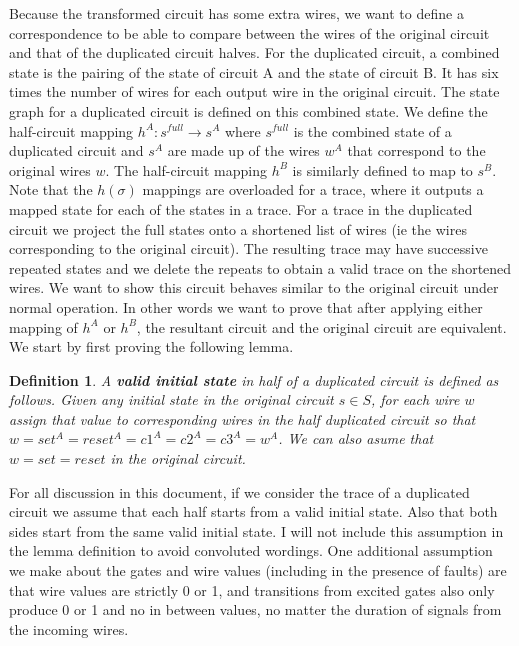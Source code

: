 \documentclass{article}
\newtheorem*{definition}{Definition}
\begin{document}
Because the transformed circuit has some extra wires, we want to define a correspondence to be able to compare between the wires of the original circuit and that of the duplicated circuit halves.  For the duplicated circuit, a combined state is the pairing of the state of circuit A and the state of circuit B. It has six times the number of wires for each output wire in the original circuit.  The state graph for a duplicated circuit is defined on this combined state.  We define the half-circuit mapping $h^A: s^{full} \to s^A$ where $s^{full}$ is the combined state of a duplicated circuit and $s^A$ are made up of the wires $w^A$ that correspond to the original wires $w$.  The half-circuit mapping $h^B$ is similarly defined to map to $s^B$.  Note that the $h(\sigma)$ mappings are overloaded for a trace, where it outputs a mapped state for each of the states in a trace.%
For a trace in the duplicated circuit we project the full states onto a shortened list of wires (ie the wires corresponding to the original circuit). The resulting trace may have successive repeated states and we delete the repeats to obtain a valid trace on the shortened wires.  %
\newline
We want to show this circuit behaves similar to the original circuit under normal operation.  In other words we want to prove that after applying either mapping of $h^A$ or $h^B$, the resultant circuit and the original circuit are equivalent.  We start by first proving the following lemma.

\begin{definition} A \textbf{valid initial state} in half of a duplicated circuit is defined as follows.  Given any initial state in the original circuit $s \in S$, for each wire $w$ assign that value to corresponding wires in the half duplicated circuit so that $w=set^A=reset^A=c1^A=c2^A=c3^A=w^A$.  We can also asume that $w=set=reset$ in the original circuit.
\end{definition}
For all discussion in this document, if we consider the trace of a duplicated circuit we assume that each half starts from a valid initial state.  Also that both sides start from the same valid initial state.  I will not include this assumption in the lemma definition to avoid convoluted wordings.  
One additional assumption we make about the gates and wire values (including in the presence of faults) are that wire values are strictly 0 or 1, and transitions from excited gates also only produce 0 or 1 and no in between values, no matter the duration of signals from the incoming wires.
\end{document}
